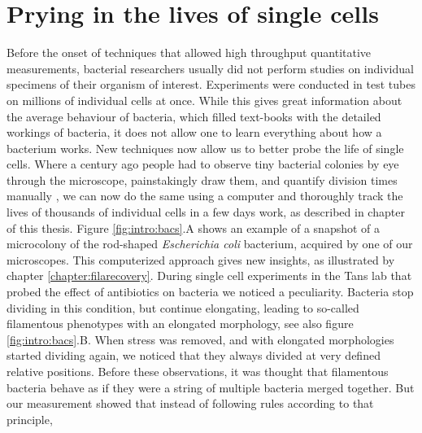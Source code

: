 \section{Prying in the lives of single cells}

%
%
Before the onset of techniques that allowed high throughput quantitative measurements, bacterial researchers usually did not perform studies on individual specimens of their organism of interest.
%
Experiments 
were conducted in test tubes on millions of individual cells at once.
%
While this gives great information about the average behaviour of bacteria, 
which filled text-books with the detailed workings of bacteria,
it does not allow one to learn everything about how a bacterium works.
%
%
New techniques now allow us to better probe the life of single cells.
%
Where a century ago people had to observe tiny bacterial colonies by eye through the microscope, painstakingly draw them, and quantify division times manually \cite{Kelly1932},
we can now do the same using a computer and 
thoroughly track the lives of thousands of individual cells in a few days work, as described in chapter \cite{chapter:methods} of this thesis.
%
Figure \ref{fig:intro:bacs}.A shows an example of a snapshot of a microcolony of the rod-shaped \textit{Escherichia coli} bacterium, acquired by one of our microscopes.
%
This computerized approach gives new insights, as illustrated by chapter \ref{chapter:filarecovery}.
%
During single cell experiments in the Tans lab that probed the effect of antibiotics on \ecoli bacteria \cite{RozendaalVerslagXXX} we noticed a peculiarity.
%
Bacteria stop dividing in this condition, but continue elongating, leading to so-called filamentous phenotypes with an elongated morphology, see also figure \ref{fig:intro:bacs}.B.
%
When stress was removed, and \ecoli with elongated morphologies started dividing again, 
we noticed that 
they always divided at very defined relative positions.
%
Before these observations, it was thought that filamentous bacteria behave as if they were a string of multiple bacteria merged together.
%
But our measurement showed that instead of following rules according to that principle, 
